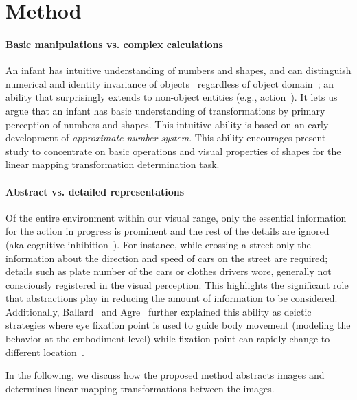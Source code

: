 \section{Method}
\paragraph*{Basic manipulations vs. complex calculations}
An infant has intuitive understanding of numbers and shapes, and can distinguish numerical and identity invariance of objects~\cite{izard2008distinct} regardless of object domain~\cite{wynn2002enumeration}; an ability that surprisingly extends to non-object entities (e.g., action~\cite{sharon1998individuation}). It lets us argue that an infant has basic understanding of transformations by primary perception of numbers and shapes. This intuitive ability is based on an early development of \textit{approximate number system}. This ability encourages present study to concentrate on basic operations and visual properties of shapes for the linear mapping transformation determination task.

\paragraph*{Abstract vs. detailed representations}
Of the entire environment within our visual range, only the essential information for the action in progress is prominent and the rest of the details are ignored~\cite{intraub1997representation} (aka cognitive inhibition~\cite{macleod2007concept}).  For instance, while crossing a street only the information about the direction and speed of cars on the street are required; details such as plate number of the cars or clothes drivers wore, generally not consciously registered in the visual perception. This highlights the significant role that abstractions play in reducing the amount of information to be considered. Additionally, Ballard~\cite{ballard1997deictic} and Agre~\cite{agre1987pengi} further explained this ability as deictic strategies where eye fixation point is used to guide body movement (modeling the behavior at the embodiment level) while fixation point can rapidly change to different location~\cite{ballard1991animate}. 

In the following, we discuss how the proposed method abstracts images and determines linear mapping transformations between the images. 


